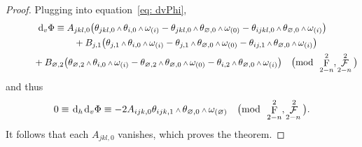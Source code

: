 \documentclass[pdftex]{sigma}
\renewcommand{\d}{{\rm d}}
\renewcommand{\mod}[1]{\quad\big(\mathrm{mod\enspace} #1\big)}
\newcommand{\w}{{\mathchoice{\,{\scriptstyle\wedge}\,}{{\scriptstyle\wedge}}
 {{\scriptscriptstyle\wedge}}{{\scriptscriptstyle\wedge}}}}
\newcommand{\thetas}[1]{\theta_{#1}}
\newcommand{\thetanot}{\thetas{\varnothing,0}}
\newcommand{\omegas}[1]{\omega_{(#1)}}
\DeclareMathOperator{\pwf}{F}
\DeclareMathOperator{\swf}{\mathcal{F}}
\renewcommand{\dh}{\ensuremath{\hspace{1pt} \d_h}}
\newcommand{\dv}{\ensuremath{\hspace{1pt} \d_v}}
\numberwithin{equation}{section}
\begin{document}
\begin{proof}
 Plugging into equation~\eqref{eq: dvPhi},
 \begin{gather*}
 \dv\Phi \equiv A_{jkl,0}\big(\thetas{jkl,0}\w\thetas{i,0}\w\omegas{i} - \thetas{jkl,0}\w\thetanot\w\omegas{0} - \thetas{ijkl,0}\w\thetas{\varnothing,0}\w\omegas{i}\big)
 \\ \hphantom{\dv\Phi \equiv}
{} + B_{j,1}\big(\thetas{j,1}\w\thetas{i,0}\w\omegas{i} - \thetas{j,1}\w\thetanot\w\omegas{0} - \thetas{ij,1}\w\thetas{\varnothing,0}\w\omegas{i}\big)
\\ \hphantom{\dv\Phi \equiv}
{} + B_{\varnothing,2}\big(\thetas{\varnothing,2}\w\thetas{i,0}\w\omegas{i} - \thetas{\varnothing,2}\w\thetanot\w\omegas{0} - \thetas{i,2}\w\thetas{\varnothing,0}\w\omegas{i}\big)
 \mod{\pwf^2_{2-n}, \swf^2_{2-n}}
 \end{gather*}
 and thus
 \begin{gather*}
 0 \equiv \dh\dv\Phi \equiv -2A_{ijk,0}\thetas{ijk,1}\w\thetanot\w\omegas{\varnothing} \mod{\pwf^2_{2-n}, \swf^2_{2-n}} .
 \end{gather*}
 It follows that each $A_{jkl,0}$ vanishes, which proves the theorem.
\end{proof}
\end{document}
